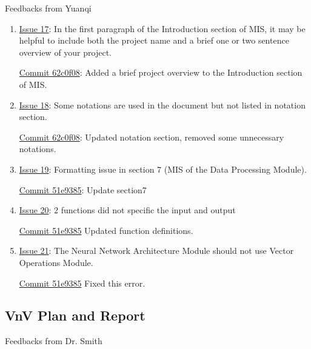 \documentclass{article}
\begin{document}
Feedbacks from Yuanqi

\begin{enumerate}
    \item \href{https://github.com/V-AS/Two-tower-recommender-system/issues/17}{Issue 17}: In the first paragraph of the Introduction section of MIS, it may be helpful to include both the project name and a brief one or two sentence overview of your project.
    
    \href{https://github.com/V-AS/Two-tower-recommender-system/commit/62c0f08fcc7f92887016aeb634b15b6e7793a360}{Commit 62c0f08}: Added a brief project overview to the Introduction section of MIS.

    \item \href{https://github.com/V-AS/Two-tower-recommender-system/issues/18}{Issue 18}: Some notations are used in the document but not listed in notation section.
    
    \href{https://github.com/V-AS/Two-tower-recommender-system/commit/62c0f08fcc7f92887016aeb634b15b6e7793a360}{Commit 62c0f08}: Updated notation section, removed some unnecessary notations.

    \item \href{https://github.com/V-AS/Two-tower-recommender-system/issues/19}{Issue 19}: Formatting issue in section 7 (MIS of the Data Processing Module).
    
    \href{https://github.com/V-AS/Two-tower-recommender-system/commit/51e9385ee64183b85093d1928ef3424c8759c587}{Commit 51e9385}: Update section7

    \item \href{https://github.com/V-AS/Two-tower-recommender-system/issues/20}{Issue 20}: 2 functions did not specific the input and output
    
    \href{https://github.com/V-AS/Two-tower-recommender-system/commit/51e9385ee64183b85093d1928ef3424c8759c587}{Commit 51e9385} Updated function definitions.

    \item \href{https://github.com/V-AS/Two-tower-recommender-system/issues/21}{Issue 21}: The Neural Network Architecture Module should not use Vector Operations Module.
    
    \href{https://github.com/V-AS/Two-tower-recommender-system/commit/51e9385ee64183b85093d1928ef3424c8759c587}{Commit 51e9385} Fixed this error.
\end{enumerate}

\subsection{VnV Plan and Report}
Feedbacks from Dr. Smith
\end{document}
